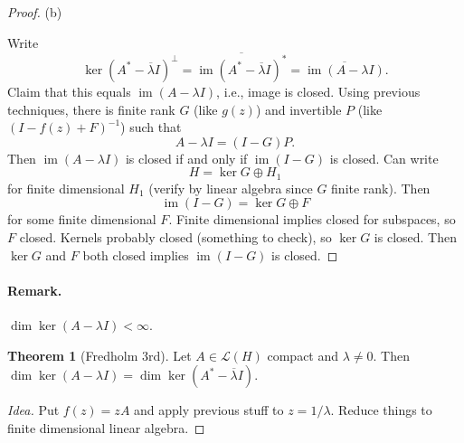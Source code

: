 \documentclass[12pt]{article}
\theoremstyle{definition}
\newtheorem{theorem}{Theorem}
\newcommand{\LL}{\mathcal{L}}
\newcommand{\<}{\left\langle}
\renewcommand{\>}{\right\rangle}
\DeclareMathOperator{\im}{im}
\newcommand{\clo}{\overline}
\newcommand{\conj}{\overline}
\begin{document}
\begin{proof}
    (b)

    Write
    \[
        \ker(A^* - \conj{\lambda}I)^\perp
            = \clo{\im(A^* - \conj{\lambda}I)^*}
            = \clo{\im(A - \lambda I)}.
    \]
    Claim that this equals $\im(A - \lambda I)$, i.e., image is closed.
    Using previous techniques, there is finite rank $G$ (like $g(z)$) and invertible $P$ (like $(I - f(z) + F)^{-1}$) such that
    \[
        A - \lambda I = (I - G) P.
    \]
    Then $\im(A - \lambda I)$ is closed if and only if $\im(I - G)$ is closed.
    Can write
    \[
        H = \ker G \oplus H_1
    \]
    for finite dimensional $H_1$ (verify by linear algebra since $G$ finite rank).
    Then
    \[
        \im(I - G) = \ker G \oplus F
    \]
    for some finite dimensional $F$.
    Finite dimensional implies closed for subspaces, so $F$ closed.
    Kernels probably closed (something to check), so $\ker G$ is closed.
    Then $\ker G$ and $F$ both closed implies $\im(I - G)$ is closed.
\end{proof}

\paragraph{Remark.} $\dim\ker(A - \lambda I) < \infty$.


\begin{theorem}[Fredholm 3rd]
    Let $A \in \LL(H)$ compact and $\lambda \ne 0$.
    Then $\dim\ker(A - \lambda I) = \dim\ker(A^* - \conj{\lambda}I)$.
\end{theorem}

\begin{proof}[Idea]
    Put $f(z) = zA$ and apply previous stuff to $z = 1/\lambda$.
    Reduce things to finite dimensional linear algebra.
\end{proof}
\end{document}
